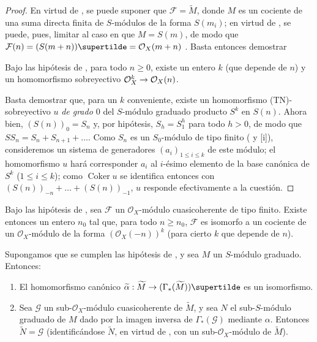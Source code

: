 \documentclass[oneside,10pt]{amsart}
\makeatletter
\renewcommand{\leq}{\leqslant}
\renewcommand{\geq}{\geqslant}
\newcommand{\ega@arrow}[2]{\mathchoice{#1}{#2}{#2}{#2}}
\renewcommand{\to}{\ega@arrow{\longrightarrow}{\rightarrow}}
\newcommand{\oldpage}[2][]{\marginnote{\normalfont\footnotesize\textbf{#1}~|~#2}\ignorespaces}
\let\EGAOriginalLabel\label
\renewcommand{\label}[1]{\phantomsection\EGAOriginalLabel{#1}}
\makeatother
\begin{document}
\begin{proof}
En virtud de , se puede suponer que $\mathcal{F}=\widetilde{M}$, donde $M$ es un cociente de una suma directa finita de $S$-módulos de la forma $S(m_i)$; en virtud de , se puede, pues, limitar al caso en que $M=S(m)$, de modo que $\mathcal{F}(n)=(S(m+n))\supertilde
=\mathcal{O}_X(m+n)$ .
Basta entonces demostrar

\oldpage[II]{41}
  \begin{lemma}[2.7.9.1]
  \label{II.2.7.9.1-fr}
  Bajo las hipótesis de , para todo $n\geq0$, existe un entero $k$ (que depende de $n$) y un homomorfismo sobreyectivo $\mathcal{O}_X^k\to\mathcal{O}_X(n)$.
  \end{lemma}

Basta  demostrar que, para un $k$ conveniente, existe un homomorfismo (TN)-sobreyectivo $u$ \emph{de grado $0$} del $S$-módulo graduado producto $S^k$ en $S(n)$.
Ahora bien, $(S(n))_0=S_n$ y, por hipótesis, $S_h=S_1^h$ para todo $h>0$, de modo que $SS_n=S_n+S_{n+1}+\ldots$.
Como $S_n$ es un $S_0$-módulo de tipo finito ( y [i]), consideremos un sistema de generadores $(a_i)_{1\leq i\leq k}$ de este módulo; el homomorfismo $u$ hará corresponder $a_i$ al $i$-ésimo elemento de la base canónica de $S^k$ ($1\leq i\leq k$); como $\operatorname{Coker}u$ se identifica entonces con $(S(n))_{-n}+\ldots+(S(n))_{-1}$, $u$ responde efectivamente a la cuestión.
\end{proof}

\begin{corollary}[2.7.10]
\label{II.2.7.10-fr}
Bajo las hipótesis de , sea $\mathcal{F}$ un $\mathcal{O}_X$-módulo cuasicoherente de tipo finito.
Existe entonces un entero $n_0$ tal que, para todo $n\geq n_0$, $\mathcal{F}$ es isomorfo a un cociente de un $\mathcal{O}_X$-módulo de la forma $(\mathcal{O}_X(-n))^k$ (para cierto $k$ que depende de $n$).
\end{corollary}

\begin{proposition}[2.7.11]
\label{II.2.7.11-fr}
Supongamos que se cumplen las hipótesis de , y sea $M$ un $S$-módulo graduado.
Entonces:
\begin{enumerate}
  \item[{\rm(i)}] El homomorfismo canónico $\widetilde{\alpha}:\widetilde{M}\to
    (\Gamma_*(\widetilde{M}))\supertilde$ es un isomorfismo.
  \item[{\rm(ii)}] Sea $\mathcal{G}$ un sub-$\mathcal{O}_X$-módulo cuasicoherente de $\widetilde{M}$, y sea $N$ el sub-$S$-módulo graduado de $M$ dado por la imagen inversa de $\Gamma_*(\mathcal{G})$ mediante $\alpha$.
    Entonces $\widetilde{N}=\mathcal{G}$ (identificándose $\widetilde{N}$, en virtud de , con un sub-$\mathcal{O}_X$-módulo de $\widetilde{M}$).
\end{enumerate}
\end{proposition}
\end{document}
